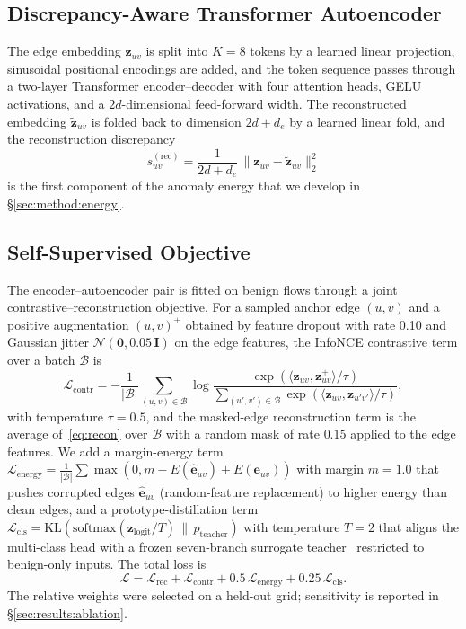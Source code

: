 \documentclass[journal,twoside]{IEEEtran}
\begin{document}
\subsection{Discrepancy-Aware Transformer Autoencoder}
\label{sec:method:txae}
The edge embedding $\mathbf{z}_{uv}$ is split into $K = 8$ tokens by a
learned linear projection, sinusoidal positional encodings are added, and
the token sequence passes through a two-layer Transformer
encoder--decoder with four attention heads, GELU activations, and a
$2d$-dimensional feed-forward width. The reconstructed embedding
$\tilde{\mathbf{z}}_{uv}$ is folded back to dimension $2d + d_e$ by a
learned linear fold, and the reconstruction discrepancy
\begin{equation}
s_{uv}^{(\mathrm{rec})} = \frac{1}{2d + d_e}\,\|\mathbf{z}_{uv} - \tilde{\mathbf{z}}_{uv}\|_2^2
\label{eq:recon}
\end{equation}
is the first component of the anomaly energy that we develop in
\S\ref{sec:method:energy}.

\subsection{Self-Supervised Objective}
\label{sec:method:objective}
The encoder--autoencoder pair is fitted on benign flows through a
joint contrastive--reconstruction objective. For a sampled anchor edge
$(u,v)$ and a positive augmentation $(u,v)^+$ obtained by feature dropout
with rate 0.10 and Gaussian jitter
$\mathcal{N}(\mathbf{0}, 0.05\,\mathbf{I})$ on the edge features, the
InfoNCE contrastive term over a batch $\mathcal{B}$ is
\begin{equation}
\mathcal{L}_{\mathrm{contr}} = -\frac{1}{|\mathcal{B}|}\sum_{(u,v)\in\mathcal{B}} \log \frac{\exp(\langle \mathbf{z}_{uv}, \mathbf{z}_{uv}^+\rangle/\tau)}{\sum_{(u',v')\in\mathcal{B}} \exp(\langle \mathbf{z}_{uv}, \mathbf{z}_{u'v'}\rangle/\tau)},
\label{eq:contr}
\end{equation}
with temperature $\tau = 0.5$, and the masked-edge reconstruction term is
the average of~\eqref{eq:recon} over $\mathcal{B}$ with a random mask of
rate $0.15$ applied to the edge features. We add a margin-energy term
$\mathcal{L}_{\mathrm{energy}} = \tfrac{1}{|\mathcal{B}|}\sum \max(0, m - E(\hat{\mathbf{e}}_{uv}) + E(\mathbf{e}_{uv}))$
with margin $m = 1.0$ that pushes corrupted edges $\hat{\mathbf{e}}_{uv}$
(random-feature replacement) to higher energy than clean edges, and a
prototype-distillation term
$\mathcal{L}_{\mathrm{cls}} = \mathrm{KL}(\mathrm{softmax}(\mathbf{z}_{\mathrm{logit}}/T)\,\|\,p_{\mathrm{teacher}})$
with temperature $T = 2$ that aligns the multi-class head with a frozen
seven-branch surrogate teacher~\cite{anaedevha2024robustadv} restricted to
benign-only inputs. The total loss is
\begin{equation}
\mathcal{L} = \mathcal{L}_{\mathrm{rec}} + \mathcal{L}_{\mathrm{contr}} + 0.5\,\mathcal{L}_{\mathrm{energy}} + 0.25\,\mathcal{L}_{\mathrm{cls}}.
\label{eq:totalloss}
\end{equation}
The relative weights were selected on a held-out grid; sensitivity is
reported in \S\ref{sec:results:ablation}.
\end{document}
